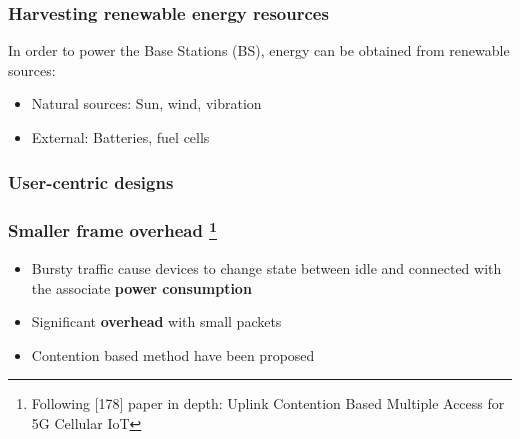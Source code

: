 \documentclass[a4paper,11pt,handout]{beamer}
\begin{document}
\note{}
\begin{frame}
\frametitle{Harvesting renewable energy resources}
In order to power the Base Stations (BS), energy can be obtained from renewable 
sources:

\begin{itemize}
\item Natural sources: Sun, wind, vibration
\item External: Batteries, fuel cells
\end{itemize}
\end{frame}
\begin{frame}
	\frametitle{User-centric designs}
\end{frame}
\note{}
\begin{frame}
	\frametitle{Smaller frame overhead %
		\footnote{Following [178] paper in depth: Uplink Contention Based Multiple 
		Access for 5G Cellular IoT}%
	}

	\begin{itemize}
		\item Bursty traffic cause devices to change state between idle and 
		connected with the associate \textbf{power consumption}
		\item Significant \textbf{overhead} with small packets
		\item Contention based method have been proposed
		\end{itemize}
\end{frame}
\end{document}
